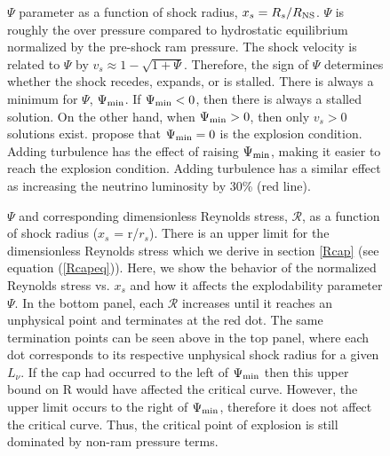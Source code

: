 \documentclass[twocolumn]{aastex6}
\begin{document}
\begin{figure}[t]
\caption{$\Psi$ parameter as a function of
    shock radius, $x_s = R_s/R_{\rm NS}$.  $\Psi$ is roughly the over
    pressure compared to hydrostatic equilibrium normalized by the
    pre-shock ram pressure.  The shock velocity is related to
    $\Psi$ by $v_s \approx 1 - \sqrt{1 + \Psi}$.  Therefore, the sign
    of $\Psi$ determines whether the shock recedes, expands, or is
    stalled.  There is always a minimum for $\Psi$, $\Psi_{\rm min}$.
  If $\Psi_{\rm min} < 0$, then there is always a stalled solution.
  On the other hand, when $\Psi_{\rm min} > 0$, then only $v_s > 0$
  solutions exist.  \citet{murphy17} propose that $\Psi_{\rm min}=0$
  is the explosion condition.  Adding turbulence has the effect of
  raising $\Psi_{\rm min}$, making it easier to reach the explosion
  condition.  Adding turbulence has a similar effect as increasing the
  neutrino luminosity by 30\% (red line). 
}
\label{psi}
\end{figure}
\begin{figure}[t]
\caption{$\Psi$ and corresponding dimensionless Reynolds stress, $\mathcal{R}$, as a function of shock radius ($x_s$ = r/$r_s$). There is an upper limit for the dimensionless Reynolds stress which we derive in section \ref{Rcap} (see equation (\ref{Rcapeq})). Here, we show the behavior of the normalized Reynolds stress vs. $x_s$ and how it affects the explodability parameter $\Psi$. In the bottom panel, each $\mathcal{R}$ increases until it reaches an unphysical point and terminates at the red dot. The same termination points can be seen above in the top panel, where each dot corresponds to its respective unphysical shock radius for a given $L_\nu$. If the cap had occurred to the left of $\Psi_{\rm min}$ then this upper bound on R would have affected the critical curve. However, the upper limit occurs to the right of $\Psi_{\rm min}$, therefore it does not affect the critical curve. Thus, the critical point of explosion is still dominated by non-ram pressure terms.}
\label{manycaps}
\end{figure}
\end{document}
